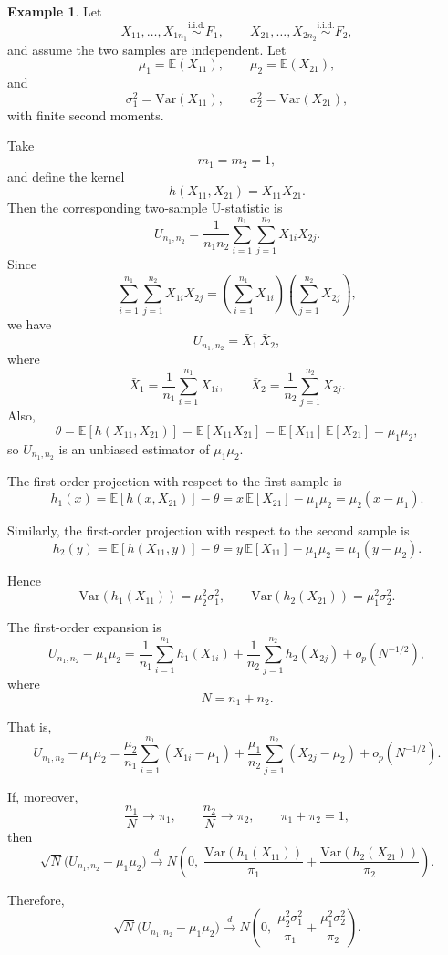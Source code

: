 \documentclass[11pt]{article}
\theoremstyle{definition}
\newtheorem{exmp}{Example}[section]
\begin{document}
\begin{exmp}
Let
\[
X_{11},\dots,X_{1n_1}\overset{\text{i.i.d.}}{\sim}F_1,
\qquad
X_{21},\dots,X_{2n_2}\overset{\text{i.i.d.}}{\sim}F_2,
\]
and assume the two samples are independent. Let
\[
\mu_1=\mathbb{E}(X_{11}),\qquad \mu_2=\mathbb{E}(X_{21}),
\]
and
\[
\sigma_1^2=\mathrm{Var}(X_{11}),\qquad \sigma_2^2=\mathrm{Var}(X_{21}),
\]
with finite second moments.

Take
\[
m_1=m_2=1,
\]
and define the kernel
\[
h(X_{11},X_{21})=X_{11}X_{21}.
\]
Then the corresponding two-sample U-statistic is
\[
U_{n_1,n_2}
=
\frac{1}{n_1n_2}\sum_{i=1}^{n_1}\sum_{j=1}^{n_2} X_{1i}X_{2j}.
\]
Since
\[
\sum_{i=1}^{n_1}\sum_{j=1}^{n_2} X_{1i}X_{2j}
=
\left(\sum_{i=1}^{n_1}X_{1i}\right)\left(\sum_{j=1}^{n_2}X_{2j}\right),
\]
we have
\[
U_{n_1,n_2}
=
\bar X_1\,\bar X_2,
\]
where
\[
\bar X_1=\frac{1}{n_1}\sum_{i=1}^{n_1}X_{1i},
\qquad
\bar X_2=\frac{1}{n_2}\sum_{j=1}^{n_2}X_{2j}.
\]
Also,
\[
\theta
=
\mathbb{E}[h(X_{11},X_{21})]
=
\mathbb{E}[X_{11}X_{21}]
=
\mathbb{E}[X_{11}]\,\mathbb{E}[X_{21}]
=
\mu_1\mu_2,
\]
so \(U_{n_1,n_2}\) is an unbiased estimator of \(\mu_1\mu_2\).

The first-order projection with respect to the first sample is
\[
h_1(x)
=
\mathbb{E}[h(x,X_{21})]-\theta
=
x\,\mathbb{E}[X_{21}]-\mu_1\mu_2
=
\mu_2(x-\mu_1).
\]

Similarly, the first-order projection with respect to the second sample is
\[
h_2(y)
=
\mathbb{E}[h(X_{11},y)]-\theta
=
y\,\mathbb{E}[X_{11}]-\mu_1\mu_2
=
\mu_1(y-\mu_2).
\]

Hence
\[
\mathrm{Var}(h_1(X_{11}))=\mu_2^2\sigma_1^2,
\qquad
\mathrm{Var}(h_2(X_{21}))=\mu_1^2\sigma_2^2.
\]

The first-order expansion is
\[
U_{n_1,n_2}-\mu_1\mu_2
=
\frac{1}{n_1}\sum_{i=1}^{n_1}h_1(X_{1i})
+
\frac{1}{n_2}\sum_{j=1}^{n_2}h_2(X_{2j})
+
o_p(N^{-1/2}),
\]
where
\[
N=n_1+n_2.
\]

That is,
\[
U_{n_1,n_2}-\mu_1\mu_2
=
\frac{\mu_2}{n_1}\sum_{i=1}^{n_1}(X_{1i}-\mu_1)
+
\frac{\mu_1}{n_2}\sum_{j=1}^{n_2}(X_{2j}-\mu_2)
+
o_p(N^{-1/2}).
\]

If, moreover,
\[
\frac{n_1}{N}\to \pi_1,\qquad \frac{n_2}{N}\to \pi_2,
\qquad \pi_1+\pi_2=1,
\]
then
\[
\sqrt{N}\bigl(U_{n_1,n_2}-\mu_1\mu_2\bigr)
\xrightarrow{d}
N\!\left(
0,\;
\frac{\mathrm{Var}(h_1(X_{11}))}{\pi_1}
+
\frac{\mathrm{Var}(h_2(X_{21}))}{\pi_2}
\right).
\]

Therefore,
\[
\sqrt{N}\bigl(U_{n_1,n_2}-\mu_1\mu_2\bigr)
\xrightarrow{d}
N\!\left(
0,\;
\frac{\mu_2^2\sigma_1^2}{\pi_1}
+
\frac{\mu_1^2\sigma_2^2}{\pi_2}
\right).
\]
\end{exmp}
\end{document}
